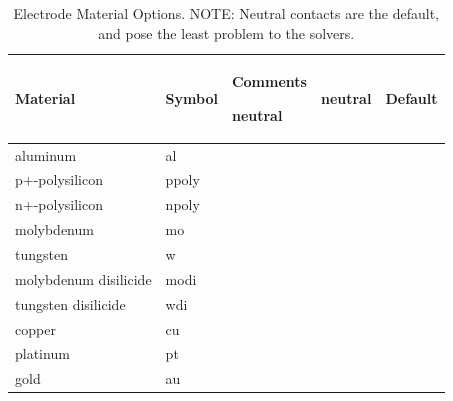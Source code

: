

\small

\begin{longtable}[htbp]{|
>{\setlength{\hsize}{0.6\hsize}}Y|
>{\setlength{\hsize}{0.3\hsize}}Y|
>{\setlength{\hsize}{0.3\hsize}}Y|} 
  \caption[Electrode Material Options]{Electrode Material Options.  NOTE:	Neutral
  contacts are the default, and pose the least problem to the solvers.  
    \label{contactMaterialTable}} \\ \hline

\color{white} \bf Material &
\color{white} \bf Symbol &
\color{white} \bf Comments \endhead \hline 

   neutral                &  neutral   & Default \\ \hline
   aluminum               &  al        & \\ \hline
   p+-polysilicon         &  ppoly     & \\ \hline
   n+-polysilicon         &  npoly     & \\ \hline
   molybdenum             &  mo        & \\ \hline
   tungsten               &  w         & \\ \hline
   molybdenum disilicide  &  modi      & \\ \hline
   tungsten disilicide    &  wdi       & \\ \hline
   copper                 &  cu        & \\ \hline
   platinum               &  pt        & \\ \hline
   gold                   &  au        & \\ \hline



\end{longtable}


